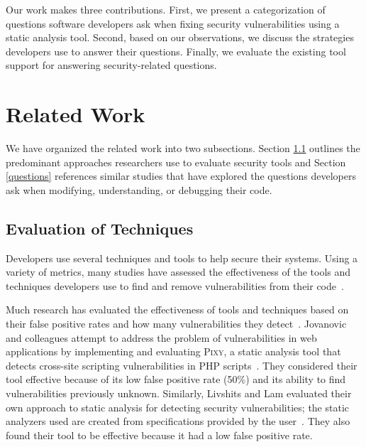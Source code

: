 \documentclass{acm_proc_article-sp}
\begin{document}
Our work makes three contributions. 
First, we present a categorization of questions software developers ask when fixing security vulnerabilities using a static analysis tool.
Second, based on our observations, we discuss the strategies developers use to answer their questions.
Finally, we evaluate the existing tool support for answering security-related questions.



\section{Related Work}
\label{sec:rw}

We have organized the related work into two subsections. Section \ref{evaluation} outlines the predominant approaches researchers use to evaluate security tools and Section \ref{questions} references similar studies that have explored the questions developers ask when modifying, understanding, or debugging their code.

\subsection{Evaluation of Techniques}
\label{evaluation}
Developers use several techniques and tools to help secure their systems.
Using a variety of metrics, many studies have assessed the effectiveness of the tools and techniques developers use to find and remove vulnerabilities from their code~\cite{martin2005finding, austin2011one, livshits2005finding}.  

Much research has evaluated the effectiveness of tools and techniques based on their false positive rates and how many vulnerabilities they detect~\cite{jovanovic2006pixy, austin2011one, dukes2013case}. 
Jovanovic and colleagues attempt to address the problem of vulnerabilities in web applications by implementing and evaluating \textsc{Pixy}, a static analysis tool that detects cross-site scripting vulnerabilities in PHP scripts~\cite{jovanovic2006pixy}. 
They considered their tool effective because of its low false positive rate (50\%) and its ability to find vulnerabilities previously unknown. 
Similarly, Livshits and Lam evaluated their own approach to static analysis for detecting security vulnerabilities; the static analyzers used are created from specifications provided by the user~\cite{livshits2005finding}. 
They also found their tool to be effective because it had a low false positive rate. 
\end{document}
